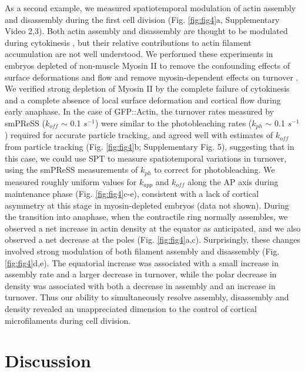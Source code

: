  As a second example, we measured spatiotemporal modulation of actin assembly and disassembly during the first cell division (Fig. \ref{fig:fig4}a, Supplementary Video 2,3). Both actin assembly and disassembly are thought to be modulated during cytokinesis \cite{nmeth32}, but their relative contributions to actin filament accumulation are not well understood. We performed these experiments in embryos depleted of non-muscle Myosin II to remove the confounding effects of surface deformations and flow and remove myosin-dependent effects on turnover \cite{nmeth3,nmeth4}. We verified strong depletion of Myosin II by the complete failure of cytokinesis and a complete absence of local surface deformation and cortical flow during early anaphase. In the case of GFP::Actin, the turnover rates measured by smPReSS ($k_{off}$ $\sim$ 0.1 $s^{-1}$) were similar to the photobleaching rates ($k_{ph}$ $\sim$ 0.1 $s^{-1}$) required for accurate particle tracking, and agreed well with estimates of $k_{off}$ from particle tracking (Fig. \ref{fig:fig4}b; Supplementary Fig. 5), suggesting that in this case, we could use SPT to measure spatiotemporal variations in turnover, using the smPReSS measurements of $k_{ph}$ to correct for photobleaching. We measured roughly uniform values for $k_{app}$ and $k_{off}$ along the AP axis during maintenance phase (Fig. \ref{fig:fig4}c-e), consistent with a lack of cortical asymmetry at this stage in myosin-depleted embryos (data not shown). During the transition into anaphase, when the contractile ring normally assembles, we observed a net increase in actin density at the equator as anticipated, and we also observed a net decrease at the poles (Fig. \ref{fig:fig4}a,c). Surprisingly, these changes involved strong modulation of both filament assembly and disassembly (Fig. \ref{fig:fig4}d,e). The equatorial increase was associated with a small increase in assembly rate and a larger decrease in turnover, while the polar decrease in density was associated with both a decrease in assembly and an increase in turnover. Thus our ability to simultaneously resolve assembly, disassembly and density revealed an unappreciated dimension to the control of cortical microfilaments during cell division.
 
 
 \section{Discussion}
 
